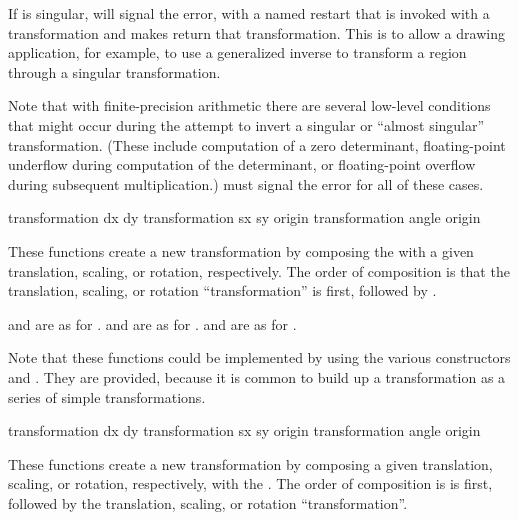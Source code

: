 If  is singular,  will signal the
 error, with a named restart that is invoked with a
transformation and makes  return that transformation.
This is to allow a drawing application, for example, to use a generalized
inverse to transform a region through a singular transformation.

Note that with finite-precision arithmetic there are several low-level
conditions that might occur during the attempt to invert a singular or ``almost
singular'' transformation.  (These include computation of a zero determinant,
floating-point underflow during computation of the determinant, or
floating-point overflow during subsequent multiplication.)
 must signal the  error
for all of these cases.

 {transformation dx dy}
     {transformation sx sy \optional origin}
    {transformation angle \optional origin} 

These functions create a new transformation by composing the
  with a given translation, scaling, or
rotation, respectively.  The order of composition is that the translation,
scaling, or rotation ``transformation'' is first, followed by
.

 and  are as for .
 and  are as for .
 and  are as for .

Note that these functions could be implemented by using the various constructors
and .  They are provided, because it is common to
build up a transformation as a series of simple transformations.


 {transformation dx dy}
     {transformation sx sy \optional origin}
    {transformation angle \optional origin} 

These functions create a new transformation by composing a given translation,
scaling, or rotation, respectively, with the 
.  The order of composition is  is
first, followed by the translation, scaling, or rotation ``transformation''.

